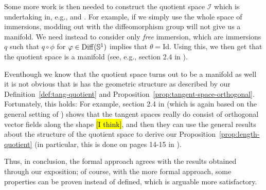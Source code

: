 Some more work is then needed to construct the quotient space $\mathcal{I}$ which is undertaking in, e.g., \cite{michor2003riemannian} and \cite{cervera1991action}. For example, if we simply use the whole space of immersions, modding out with the diffeomorphism group will not give us a manifold. We need instead to consider only \textit{free} immersion, which are immersions $q$ such that $q \circ \phi$ for $\phi \in \mathrm{Diff}(\S^1)$ implies that $\theta = \mathrm{Id}$. Using this, we then get that the quotient space is a manifold (see, e.g., section 2.4 in \cite{michor2003riemannian}).

Eventhough we know that the quotient space turns out to be a manifold as well it is not obvious that is has the geometric structure as described by our Definition~\ref{def:tang-quotient} and Proposition~\ref{prop:tangent-space-orthogonal}. Fortunately, this holds: For example, section 2.4 in \cite{michor2003riemannian} (which is again based on the general setting of \cite{kriegl1997convenient}) shows that the tangent spaces really do consist of orthogonal vector fields along the shape \hl{[I think]}, and then they can use the general results about the structure of the quotient space to derive our Proposition~\ref{prop:length-quotient} (in particular, this is done on pages 14-15 in \cite{michor2003riemannian}).

Thus, in conclusion, the formal approach agrees with the results obtained through our exposition; of course, with the more formal approach, some properties can be proven instead of defined, which is arguable more satisfactory.




